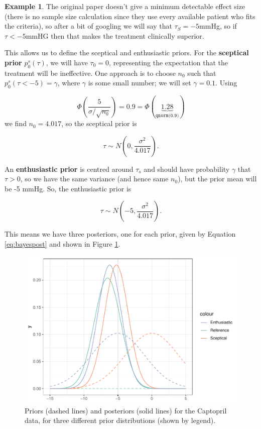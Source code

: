 \documentclass[
  openany]{book}
\theoremstyle{definition}
\theoremstyle{definition}
\newtheorem{example}{Example}[chapter]
\theoremstyle{definition}
\theoremstyle{definition}
\theoremstyle{remark}
\begin{document}
\begin{example}
The original paper \citet{hommel1986effect} doesn't give a minimum detectable effect size (there is no sample size calculation since they use every available patient who fits the criteria), so after a bit of googling we will say that \(\tau_S=-5\)mmHg, so if \(\tau<-5\)mmHG then that makes the treatment clinically superior.

This allows us to define the sceptical and enthusiastic priors. For the \textbf{sceptical prior} \(p^s_0\left(\tau\right)\), we will have \(\tau_0=0\), representing the expectation that the treatment will be ineffective. One approach is to choose \(n_0\) such that \(p^s_0\left(\tau<-5\right) = \gamma\), where \(\gamma\) is some small number; we will set \(\gamma=0.1\). Using

\[\Phi\left(\frac{5}{\sigma/\sqrt{n_0}}\right) = 0.9 = \Phi\left(\underbrace{1.28}_{\texttt{qnorm(0.9)}} \right)\]
we find \(n_0 = 4.017\), so the sceptical prior is

\[\tau \sim N\left(0, \frac{\sigma^2}{4.017}\right).\]

An \textbf{enthusiastic prior} is centred around \(\tau_s\) and should have probability \(\gamma\) that \(\tau>0\), so we have the same variance (and hence same \(n_0\)), but the prior mean will be -5 mmHg. So, the enthusiastic prior is

\[\tau \sim N\left(-5, \frac{\sigma^2}{4.017}\right).\]

This means we have three posteriors, one for each prior, given by Equation \eqref{eq:bayespost} and shown in Figure \ref{fig:simplebayes}.

\begin{figure}
\centering
\includegraphics{CT4H_notes_files/figure-latex/simplebayes-1.pdf}
\caption{\label{fig:simplebayes}Priors (dashed lines) and posteriors (solid lines) for the Captopril data, for three different prior distributions (shown by legend).}
\end{figure}


\end{example}
\end{document}
